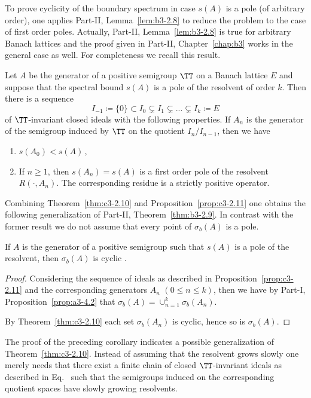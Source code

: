 To prove cyclicity of the boundary spectrum in case $s(A)$ is a pole (of arbitrary order), one applies Part-II, Lemma~\ref{lem:b3-2.8} to reduce the problem to the case of first order poles. 
Actually, Part-II, Lemma~\ref{lem:b3-2.8} is true for arbitrary Banach lattices and the proof given in Part-II, Chapter~\ref{chap:b3} works in the general case as well. 
For completeness we recall this result. 
\begin{proposition}\label{prop:c3-2.11}
	Let $A$ be the generator of a positive semigroup $\TT$ on a Banach lattice $E$ and suppose that the spectral bound $s(A)$ is a pole of the resolvent%
    of order $k$.
	Then there is a sequence
	\begin{equation}\label{eq:c3-2.22}
		I_{-1} \coloneqq \{0\} \subset I_{0} \subsetneq I_{1} \subsetneq ... \subsetneq I_{k} \coloneqq E
	\end{equation}
	of\/ $\TT$-invariant closed ideals with the following properties.
	If\/ $A_{n}$ is the generator of the semigroup induced by $\TT$ on the quotient $I_{n}/I_{n-1}$, then we have
	\begin{enumerate}[\upshape (i)]
		\item 	
		$s(A_{0}) < s(A)$\,,

		\item 
		If\/ $n \geq 1$, then $s(A_{n}) = s(A)$ is a first order pole of the resolvent $R(\cdot,A_{n})$.
		The corresponding residue is a strictly positive operator.

	\end{enumerate}
\end{proposition}
Combining Theorem~\ref{thm:c3-2.10} and Proposition~\ref{prop:c3-2.11} one obtains the following generalization of Part-II, Theorem~\ref{thm:b3-2.9}.
In contrast with the former result we do not assume that every point of\/ $\sigma_{b}(A)$ is a pole.
\begin{corollary}\label{cor:c3-2.12}
	If\/ $A$ is the generator of a positive semigroup such that $s(A)$ is a pole of the resolvent, then $\sigma_{b}(A)$ is cyclic
    .
\end{corollary}
\begin{proof}
Considering the sequence of ideals as described in Proposition~\ref{prop:c3-2.11} and the corresponding generators $A_{n}$ $(0 \leq n \leq k)$, then we have by Part-I, Proposition~\ref{prop:a3-4.2} that $\sigma_{b}(A) = \cup_{n=1}^{k} \sigma_{b}(A_{n})$.

By Theorem~\ref{thm:c3-2.10} each set $\sigma_{b}(A_{n})$ is cyclic, hence so is $\sigma_{b}(A)$.
\end{proof}
The proof of the preceding corollary indicates a possible generalization of Theorem~\ref{thm:c3-2.10}.
Instead of assuming that the resolvent grows slowly one merely needs that there exist a finite chain of closed $\TT$-invariant ideals as described in Eq.~ such that the semigroups induced on the corresponding quotient spaces have slowly growing resolvents.

